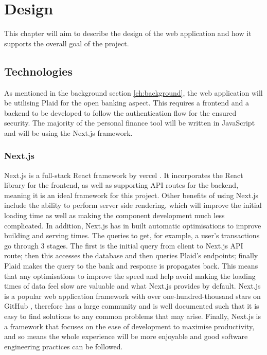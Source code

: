 \chapter{Design}
\label{ch:design}

This chapter will aim to describe the design of the web application and how it supports the overall goal of the project.

\section{Technologies}
\label{sec:technologies}
As mentioned in the background section \ref{ch:background}, the web application will be utilising Plaid for the open banking aspect. This requires a frontend and a backend to be developed to follow the authentication flow for the ensured security. The majority of the personal finance tool will be written in JavaScript and will be using the Next.js framework.

\subsection{Next.js}
Next.js is a full-stack React framework by vercel \cite{Next.js}. It incorporates the React library for the frontend, as well as supporting API routes for the backend, meaning it is an ideal framework for this project. Other benefits of using Next.js include the ability to perform server side rendering, which will improve the initial loading time as well as making the component development much less complicated. In addition, Next.js has in built automatic optimisations to improve building and serving times. The queries to get, for example, a user's transactions go through 3 stages. The first is the initial query from client to Next.js API route; then this accesses the database and then queries Plaid's endpoints; finally Plaid makes the query to the bank and response is propagates back. This means that any optimisations to improve the speed and help avoid making the loading times of data feel slow are valuable and what Next.js provides by default. Next.js is a popular web application framework with over one-hundred-thousand stars on GitHub \cite{NextGitHub}, therefore has a large community and is well documented such that it is easy to find solutions to any common problems that may arise. Finally, Next.js is a framework that focuses on the ease of development to maximise productivity, and so means the whole experience will be more enjoyable and good software engineering practices can be followed.

